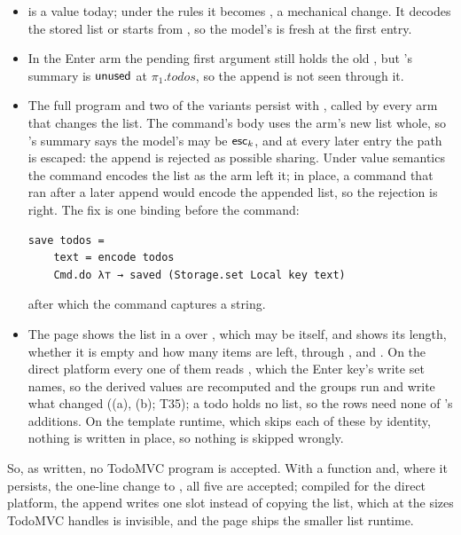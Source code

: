 \begin{itemize}
\item {} is a value today; under the rules it becomes , a mechanical change. It
decodes the stored list or starts from \code{[]}, so the model's  is fresh at the first entry.
\item In the Enter arm the pending first argument still holds the old , but 's
summary is $\mathsf{unused}$ at $\pi_1.\mathit{todos}$, so the append is not seen through it.
\item The full program and two of the variants persist with
, called by every arm that
changes the list. The command's body uses the arm's new list whole, so 's summary says the
model's  may be $\mathsf{esc}_k$, and at every later entry the path is escaped: the append is rejected
as possible sharing. Under value semantics the command encodes the list as the arm left it; in place, a
command that ran after a later append would encode the appended list, so the rejection is right. The
fix is one binding before the command:
\begin{Verbatim}
save todos =
    text = encode todos
    Cmd.do λ⊤ → saved (Storage.set Local key text)
\end{Verbatim}
after which the command captures a string.
\item The page shows the list in a  over ,
which may be  itself, and shows its length, whether it is empty and how many items are
left, through ,
 and . On the
direct platform every one of them reads , which the Enter key's write set names, so the derived
values are recomputed and the groups run and write what changed ((a), (b); T35); a todo holds no
list, so the rows need none of 's additions. On the template runtime, which skips each of these by
identity, nothing is written in place, so nothing is skipped wrongly.
\end{itemize}
So, as written, no TodoMVC program is accepted. With  a function and, where it persists, the
one-line change to , all five are accepted; compiled for the direct platform, the append writes
one slot instead of copying the list, which at the sizes TodoMVC handles is invisible, and the page ships
the smaller list runtime.

